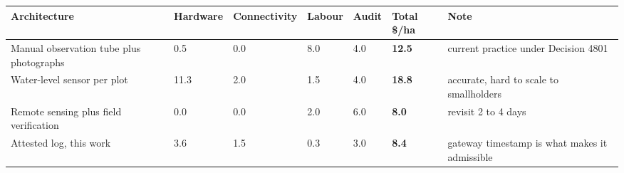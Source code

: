 
\begin{tabular}{@{}p{3.00cm}p{1.10cm}p{1.30cm}p{1.00cm}p{0.85cm}p{1.10cm}p{4.00cm}@{}}
\toprule
Architecture & Hardware & Connectivity & Labour & Audit & Total \$/ha & Note \\
\midrule
Manual observation tube plus photographs & 0.5 & 0.0 & 8.0 & 4.0 & \textbf{12.5} & current practice under Decision 4801 \\
Water-level sensor per plot & 11.3 & 2.0 & 1.5 & 4.0 & \textbf{18.8} & accurate, hard to scale to smallholders \\
Remote sensing plus field verification & 0.0 & 0.0 & 2.0 & 6.0 & \textbf{8.0} & revisit 2 to 4 days \\
Attested log, this work & 3.6 & 1.5 & 0.3 & 3.0 & \textbf{8.4} & gateway timestamp is what makes it admissible \\
\bottomrule
\end{tabular}
